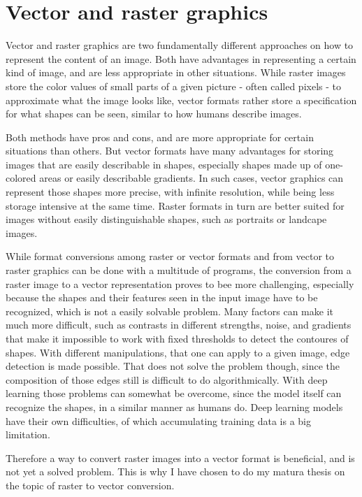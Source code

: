 \documentclass[12pt, a4paper, titlepage]{report}
\begin{document}
\section{Vector and raster graphics}

Vector and raster graphics are two fundamentally different approaches on how to represent the content of an image. Both have advantages in representing a certain kind of image, and are less appropriate in other situations. While raster images store the color values of small parts of a given picture - often called pixels - to approximate what the image looks like, vector formats rather store a specification for what shapes can be seen, similar to how humans describe images.

Both methods have pros and cons, and are more appropriate for certain situations than others. But vector formats have many advantages for storing images that are easily describable in shapes, especially shapes made up of one-colored areas or easily describable gradients. In such cases, vector graphics can represent those shapes more precise, with infinite resolution, while being less storage intensive at the same time. Raster formats in turn are better suited for images without easily distinguishable shapes, such as portraits or landcape images.

While format conversions among raster or vector formats and from vector to raster graphics can be done with a multitude of programs, the conversion from a raster image to a vector representation proves to bee more challenging, especially because the shapes and their features seen in the input image have to be recognized, which is not a easily solvable problem. Many factors can make it much more difficult, such as contrasts in different strengths, noise, and gradients that make it impossible to work with fixed thresholds to detect the contoures of shapes. With different manipulations, that one can apply to a given image, edge detection is made possible. That does not solve the problem though, since the composition of those edges still is difficult to do algorithmically.
With deep learning those problems can somewhat be overcome, since the model itself can recognize the shapes, in a similar manner as humans do. Deep learning models have their own difficulties, of which accumulating training data is a big limitation.

Therefore a way to convert raster images into a vector format is beneficial, and is not yet a solved problem. This is why I have chosen to do my matura thesis on the topic of raster to vector conversion.
\end{document}
